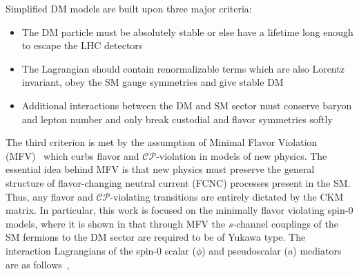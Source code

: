 \begin{figure}
\caption{}
\label{fig:models}
\end{figure}

Simplified DM models are built upon three major criteria:

\begin{itemize}
  \item The DM particle must be absolutely stable or else have a lifetime long enough to escape the LHC detectors
  \item The Lagrangian should contain renormalizable terms which are also Lorentz invariant, obey the SM gauge symmetries and give stable DM
  \item Additional interactions between the DM and SM sector must conserve baryon and lepton number and only break custodial and flavor symmetries softly~\cite{Abdallah:2015ter}
\end{itemize}

The third criterion is met by the assumption of Minimal Flavor Violation (MFV)~\cite{PhysRevLett.65.2939} which curbs flavor and $\mathcal{CP}$-violation in models of new physics. The essential idea behind MFV is that new physics must preserve the general structure of flavor-changing neutral current (FCNC) processes present in the SM. Thus, any flavor and $\mathcal{CP}$-violating transitions are entirely dictated by the CKM matrix. In particular, this work is focused on the minimally flavor violating spin-0 models, where it is shown in \cite{Abdallah:2015ter} that through MFV the $s$-channel couplings of the SM fermions to the DM sector are required to be of Yukawa type. The interaction Lagrangians of the spin-0 scalar ($\phi$) and pseudoscalar ($a$) mediators are as follows~\cite{Abercrombie:2015wmb},

